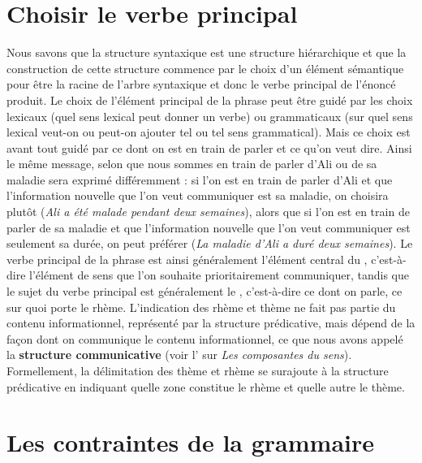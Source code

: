 \section{Choisir le verbe principal}\label{sec:1.2.13}

Nous savons que la structure syntaxique est une structure hiérarchique et que la construction de cette structure commence par le choix d’un élément sémantique pour être la racine de l’arbre syntaxique et donc le verbe principal de l’énoncé produit. Le choix de l’élément principal de la phrase peut être guidé par les choix lexicaux (quel sens lexical peut donner un verbe) ou grammaticaux (sur quel sens lexical veut-on ou peut-on ajouter tel ou tel sens grammatical). Mais ce choix est avant tout guidé par ce dont on est en train de parler et ce qu’on veut dire. Ainsi le même message, selon que nous sommes en train de parler d’Ali ou de sa maladie sera exprimé différemment : si l’on est en train de parler d’Ali et que l’information nouvelle que l’on veut communiquer est sa maladie, on choisira plutôt  (\textit{Ali a été malade pendant deux semaines}), alors que si l’on est en train de parler de sa maladie et que l’information nouvelle que l’on veut communiquer est seulement sa durée, on peut préférer  (\textit{La maladie d’Ali a duré deux semaines}). Le verbe principal de la phrase est ainsi généralement l’élément central du , c’est-à-dire l’élément de sens que l’on souhaite prioritairement communiquer, tandis que le sujet du verbe principal est généralement le , c’est-à-dire ce dont on parle, ce sur quoi porte le rhème. L’indication des rhème et thème ne fait pas partie du contenu informationnel, représenté par la structure prédicative, mais dépend de la façon dont on communique le contenu informationnel, ce que nous avons appelé la \textbf{structure communicative} (voir l’ sur \textit{Les composantes du sens}). Formellement, la délimitation des thème et rhème se surajoute à la structure prédicative en indiquant quelle zone constitue le rhème et quelle autre le thème.

\section{Les contraintes de la grammaire}\label{sec:1.2.14}

